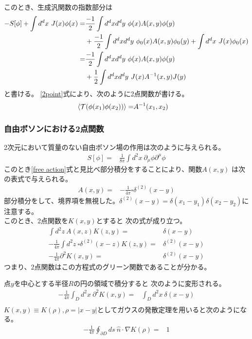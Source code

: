 \documentclass[11pt, dvipdfmx]{article}
\numberwithin{equation}{section}
\newcommand{\blankline}{\par\vspace{\baselineskip}} %
\begin{document}
このとき、生成汎関数の指数部分は
\begin{align}
    -S[\phi]+\int d^dx \ J(x)\phi(x)=&\frac{-1}{2}\int d^dx d^dy \ \phi(x)A(x,y)\phi(y) \notag\\
    &+\frac{-1}{2}\int d^dx d^dy \ \phi_0(x)A(x,y)\phi_0(y) + \int d^dx \ J(x)\phi_0(x)\nonumber
    \\
    =&\frac{-1}{2}\int d^dx d^dy \ \phi(x)A(x,y)\phi(y) \notag\\
    &+\frac{1}{2}\int d^dx d^dy \ J(x)A^{-1}(x,y)J(y)
\end{align}
と書ける。
\eqref{2point}式により、次のように2点関数が書ける。
\begin{align}
    \ev{\mathcal{T}(\phi(x_1)\phi(x_2))}=&A^{-1}(x_1,x_2)
\end{align}
\subsubsection{自由ボソンにおける2点関数}
2次元において質量のない自由ボソン場の作用は次のように与えられる。
\begin{align}
    S[\phi]=&\frac{1}{8\pi}\int d^2x \ \partial_{\mu}\phi \partial^{\mu}\phi\label{free boson}
\end{align}
このとき\eqref{free action}式と見比べ部分積分をすることにより、関数$A(x,y)$
は次の表式で与えられる。
\begin{align}
    A(x,y)=&-\frac{1}{4\pi}\square\delta^{(2)} (x-y)
\end{align}
部分積分をして、境界項を無視した。$\delta^{(2)}(x-y)=\delta(x_1-y_1)\delta(x_2-y_2)$に注意する。\\
このとき、2点関数を$K(x,y)$とすると
次の式が成り立つ。
\begin{align}
    \int d^2z \ A(x,z)K(z,y)=&\delta(x-y)\\
    -\frac{1}{4\pi}\int d^2z \ \square\delta^{(2)}(x-z) K(z,y)=&\delta^{(2)}(x-y)\\
-\frac{1}{4\pi}\partial^2 K(x,y)=&\delta^{(2)}(x-y)
\end{align}
つまり、2点関数はこの方程式のグリーン関数であることが分かる。
\blankline
点$y$を中心とする半径$R$の円の領域で積分すると
次のように変形される。
\begin{align}
     -\frac{1}{4\pi}\int_D d^2x \ \partial^2 K(x,y)=&\int_D d^2x \ \delta(x-y)\\
\end{align}
$K(x,y)\equiv K(\rho),\rho=|x-y|$としてガウスの発散定理を用いると次のようになる。
\begin{align}
    -\frac{1}{4\pi}\oint_{\partial D} ds \ \hat{n}\cdot \nabla K(\rho)=&1
\end{align}
\end{document}
